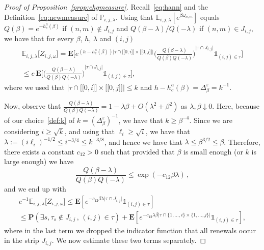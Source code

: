 \documentclass[AHL,Unicode,longabstracts]{cedram}
\newcommand{\llbracket}{\mathopen{[\![}}
\newcommand{\rrbracket}{\mathclose{]\!]}}
\newcommand{\gb}{\beta}
\newcommand{\gep}{\varepsilon}
\newcommand{\gD}{\Delta}
\newcommand{\go}{\omega}
\newcommand{\gl}{\lambda}
\newcommand{\unbf}%
{\mathds{1}}
\newcommand{\bP}{\ensuremath{\mathbf{P}}}
\newcommand{\bE}{\ensuremath{\mathbf{E}}}
\newcommand{\bbE}{\ensuremath{\mathbb{E}}}
\newcommand{\bbP}{\ensuremath{\mathbb{P}}}
\let\oldexists\exists
\renewcommand*{\exists}{\mathrel{\oldexists}}
\begin{document}
\begin{proof}[Proof of Proposition~\ref{prop:chgmeasure}]
Recall~\eqref{eq:hann} and the Definition~\eqref{eq:newmeasure} of $\bbP_{i,j,\gl}$. Using that $\bbE_{i,j,\gl}[e^{\gb \go_{n,m}}]$ equals $Q(\gb) =e^{- h_c^a(\gb)}$ if $(n,m) \notin J_{i,j}$ and $Q(\gb-\gl)/Q(-\gl)$ if $(n,m)\in J_{i,j}$, we have that for every $\beta$, $h$, $\lambda$ and $(i,j)$
\begin{multline}\label{eq:Q1}
\bbE_{i,j,\lambda} \big[Z_{i,j,\omega} \big] = \bE \bigg[e^{(h-h_c^a(\gb)) \vert \tau\cap \llbracket 0, i \rrbracket \times \llbracket 0, j \rrbracket \vert } { \Big(\frac{Q(\beta-\lambda)}{Q(\beta) Q(-\lambda)} \Big)}^{\vert \tau \cap J_{i,j} \vert} \unbf_{(i,j) \in \tau} \bigg] \\
\leq e\,\bE \bigg[{ \Big(\frac{Q(\beta-\lambda)}{Q(\beta) Q(-\lambda)} \Big)}^{ \vert \tau \cap J_{i,j} \vert } \unbf_{(i,j) \in \tau} \bigg],
\end{multline}
where we used that $\vert \tau\cap \llbracket 0, i \rrbracket \times \llbracket 0, j \rrbracket \vert \leq k$ and $h-h_c^a(\gb) = \gD_{\gb}^{\gep} = k^{-1}$.

Now, observe that $ \frac{Q(\beta-\lambda)}{Q(\beta) Q(-\lambda)} = 1 - \gl \gb +O(\gl^2 + \gb^2)$ as $\gl,\gb\downarrow 0$. Here, because of our choice~\eqref{def:k} of $k=(\gD_{\gb}^{\gep})^{-1}$, we have that $k\geq \gb^{-4}$. Since we are considering $i\geq \sqrt{k}$, and using that $\ell_i \geq \sqrt{i}$, we have that $\gl:= (i\ell_i)^{-1/2} \leq i^{-3/4} \leq k^{-3/8}$, and hence we have that $\gl \leq \gb^{3/2}\leq \gb$. Therefore, there exists a constant $c_{12}>0$ such that provided that $\gb$ is small enough (or $k$ is large enough) we have
\begin{equation}\label{eq:Q2}
\frac{Q(\beta-\lambda)}{Q(\beta) Q(-\lambda)} \le \exp(- c_{12} \beta \lambda)\,,
\end{equation}
and we end up with
\begin{multline}\label{eq:max1}
e^{-1}\bbE_{i,j,\lambda} \big[Z_{i,j,\omega} \big] \leq \bE \left[e^{ -c_{12} \gb \lambda \vert \tau \cap J_{i,j} \vert } \unbf_{(i,j) \in \tau} \right] \\
\leq \bP\left(\exists s, \tau_s \notin J_{i,j}\,,\,(i,j)\in\tau\right) + \bE\left[e^{- c_{12} \gl \gb \vert \tau \cap \lbrace 1,\dots,i \rbrace \times \lbrace 1,\dots,j \rbrace \vert } \unbf_{(i,j)\in\tau} \right],
\end{multline}
where in the last term we dropped the indicator function that all renewals occur in the strip $J_{i,j}$. We now estimate these two terms separately.


\end{proof}
\end{document}
